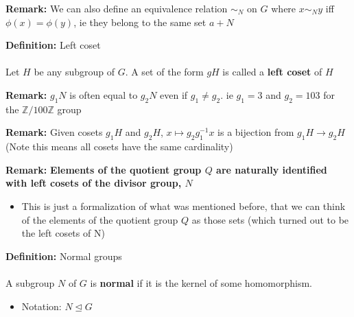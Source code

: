 \documentclass{article}
\newcommand{\Z}{\mathbb{Z}}
\begin{document}
\begin{remark} 
	\textbf{Remark:} We can also define an equivalence relation $\sim _N$ on $G$ where $x \sim _N y$ iff $\phi(x) = \phi(y)$, ie they belong to the same set $a + N$ 
\end{remark}
\begin{definition} 
\textbf{Definition:} Left coset \\
~\\
Let $H$ be any subgroup of $G$. A set of the form $gH$ is called a {\color{blue} \textbf{left coset}} of $H$
\end{definition}
\begin{remark} 
	\textbf{Remark:} $g_1N$ is often equal to $g_2N$ even if $g_1\neq g_2$. ie $g_1=3$ and $g_2=103$ for the $\Z /100\Z$ group 
\end{remark}
\begin{remark} 
	\textbf{Remark:} Given cosets $g_1H$ and $g_2H$, $x \mapsto g_2g_1^{-1}x$ is a bijection from $g_1H \to g_2H$ (Note this means all cosets have the same cardinality) 
\end{remark}
\begin{remark} 
	\textbf{Remark:} \textbf{Elements of the quotient group $Q$ are naturally identified with left cosets of the divisor group, $N$ } 
	\begin{itemize}
		\item This is just a formalization of what was mentioned before, that we can think of the elements of the quotient group $Q$ as those sets (which turned out to be the left cosets of N)
	\end{itemize}
\end{remark}
\begin{definition} 
\textbf{Definition:} Normal groups \\
~\\
A subgroup $N$ of $G$ is {\color{blue} \textbf{normal}} if it is the kernel of some homomorphism.
\begin{itemize}
	\item Notation: $N\trianglelefteq G$
\end{itemize}
\end{definition}
\end{document}
